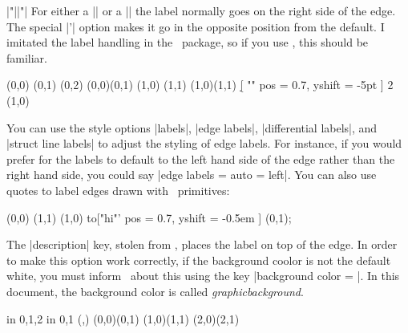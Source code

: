 \begin{sseqdata}[|| name = ex1, cohomological Serre grading]
\begin{manualentry}{|"||"|}
For either a |\structline| or a |\class| the label normally goes on the right side of the edge. The special |'| option makes it go in the opposite position from the default. I imitated the label handling in the \tikzcdpkg\ package, so if you use \tikzcdpkg, this should be familiar.
\begin{codeexample}[width = 6cm]
\begin{sseqpage}[ Adams grading, yscale = 0.63 ]
\class(0,0)
\class(0,1)
\class(0,2)
\structline["a"' blue](0,0)(0,1)
\class(1,0)
\class(1,1)
\structline["b"](1,0)(1,1)
\d[ "" { pos = 0.7, yshift = -5pt } ] 2 (1,0)
\end{sseqpage}
\end{codeexample}
You can use the style options |labels|, |edge labels|, |differential labels|, and |struct line labels| to adjust the styling of edge labels. For instance, if you would prefer for the labels to default to the left hand side of the edge rather than the right hand side, you could say |edge labels = {auto = left}|.
You can also use quotes to label edges drawn with \tikzpkg\ primitives:
\begin{codeexample}[width = 6cm]
\begin{sseqpage}[ yscale = 0.58, no axes ]
\class(0,0)
\class(1,1)
\draw (1,0) to["hi"'{ pos = 0.7, yshift = -0.5em }] (0,1);
\end{sseqpage}
\end{codeexample}
The |description| key, stolen from \tikzcdpkg, places the label on top of the edge. In order to make this option work correctly, if the background coolor is not the default white, you must inform \sseqpages\ about this using the key |background color = |. In this document, the background color is called \textit{graphicbackground}.
\begin{codeexample}[width = 6cm]
\begin{sseqpage}[ no axes, background color = graphicbackground ]
\foreach \x in {0,1,2} \foreach \y in {0,1} {
    \class(\x,\y)
}
\structline["a" red](0,0)(0,1)
\structline["a'"'blue,"b"{yshift = 1em}](1,0)(1,1)
\structline["c" description](2,0)(2,1)
\end{sseqpage}
\end{codeexample}

\end{manualentry}




\end{sseqdata}
